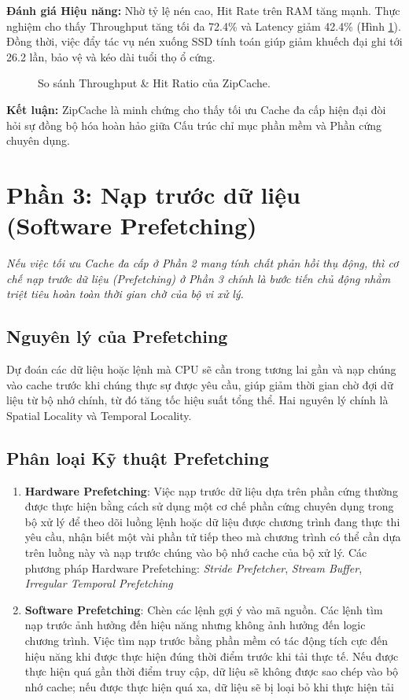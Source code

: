 \documentclass[10pt,twocolumn,a4paper]{article}
\begin{document}
\textbf{Đánh giá Hiệu năng:} Nhờ tỷ lệ nén cao, Hit Rate trên RAM tăng mạnh. Thực nghiệm cho thấy Throughput tăng tối đa 72.4\% và Latency giảm 42.4\% (Hình \ref{fig:throughput_hitratio}). Đồng thời, việc đẩy tác vụ nén xuống SSD tính toán giúp giảm khuếch đại ghi tới 26.2 lần, bảo vệ và kéo dài tuổi thọ ổ cứng.

\begin{figure}[H]
    \centering
    \caption{So sánh Throughput \& Hit Ratio của ZipCache.}
    \label{fig:throughput_hitratio}
\end{figure}


\textbf{Kết luận:} ZipCache là minh chứng cho thấy tối ưu Cache đa cấp hiện đại đòi hỏi sự đồng bộ hóa hoàn hảo giữa Cấu trúc chỉ mục phần mềm và Phần cứng chuyên dụng.

\section{Phần 3: Nạp trước dữ liệu (Software Prefetching)}
\textit{Nếu việc tối ưu Cache đa cấp ở Phần 2 mang tính chất phản hồi thụ động, thì cơ chế nạp trước dữ liệu (Prefetching) ở Phần 3 chính là bước tiến chủ động nhằm triệt tiêu hoàn toàn thời gian chờ của bộ vi xử lý.}

\subsection{Nguyên lý của Prefetching}
Dự đoán các dữ liệu hoặc lệnh mà CPU sẽ cần trong tương lai gần và nạp chúng vào cache trước khi chúng thực sự được yêu cầu, giúp giảm thời gian chờ đợi dữ liệu từ bộ nhớ chính, từ đó tăng tốc hiệu suất tổng thể.
Hai nguyên lý chính là Spatial Locality và Temporal Locality.

\subsection{Phân loại Kỹ thuật Prefetching}
\begin{enumerate}
    \item \textbf{Hardware Prefetching}: Việc nạp trước dữ liệu dựa trên phần cứng thường được thực hiện bằng cách sử dụng một cơ chế phần cứng chuyên dụng trong bộ xử lý để theo dõi luồng lệnh hoặc dữ liệu được chương trình đang thực thi yêu cầu, nhận biết một vài phần tử tiếp theo mà chương trình có thể cần dựa trên luồng này và nạp trước chúng vào bộ nhớ cache của bộ xử lý. 
    Các phương pháp Hardware Prefetching:
    \textit{Stride Prefetcher}, \textit{Stream Buffer}, \textit{Irregular Temporal Prefetching}
    \item \textbf{Software Prefetching}: Chèn các lệnh gợi ý vào mã nguồn. Các lệnh tìm nạp trước ảnh hưởng đến hiệu năng nhưng không ảnh hưởng đến logic chương trình. Việc tìm nạp trước bằng phần mềm có tác động tích cực đến hiệu năng khi được thực hiện đúng thời điểm trước khi tải thực tế. Nếu được thực hiện quá gần thời điểm truy cập, dữ liệu sẽ không được sao chép vào bộ nhớ cache; nếu được thực hiện quá xa, dữ liệu sẽ bị loại bỏ khi thực hiện tải 
\end{enumerate}
\end{document}

